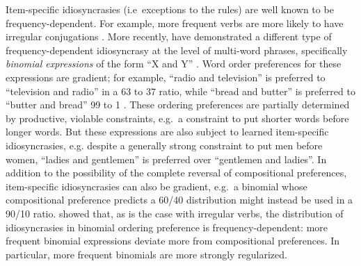 \documentclass{evolang11}
\begin{document}
Item-specific idiosyncrasies (i.e\ exceptions to the rules) are well known to be frequency-dependent. For example, more frequent verbs are more likely to have irregular conjugations \cite{Lieberman:2007bl}.
More recently,  have demonstrated a different type of frequency-dependent idiosyncrasy at the level of multi-word phrases, specifically \emph{binomial expressions} of the form ``X and Y'' \cite{Cooper:1975uz,Benor:2006gv}. Word order preferences for these expressions are gradient; for example, ``radio and television'' is preferred to ``television and radio'' in a 63 to 37 ratio, while ``bread and butter'' is preferred to ``butter and bread'' 99 to 1 \cite{Lin:2012te}. These ordering preferences are partially determined by productive, violable constraints, e.g.\ a constraint to put shorter words before longer words. But these expressions are also subject to learned item-specific idiosyncrasies, e.g. despite a generally strong constraint to put men before women, ``ladies and gentlemen'' is preferred over ``gentlemen and ladies''. In addition to the possibility of the complete reversal of compositional preferences, item-specific idiosyncrasies can also be gradient, e.g.\ a binomial whose compositional preference predicts a 60/40 distribution might instead be used in a 90/10 ratio. 
%
 showed that, as is the case  with irregular verbs, the distribution of idiosyncrasies in binomial ordering preference is frequency-dependent: more frequent binomial expressions deviate more from compositional preferences.  In particular, more frequent binomials are more strongly regularized.
\end{document}
